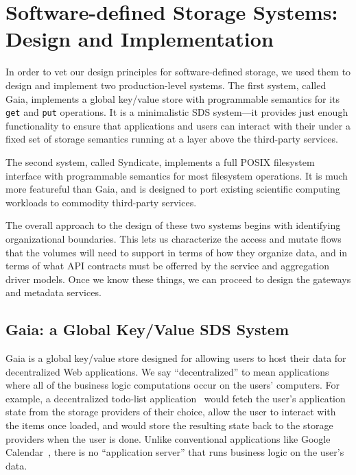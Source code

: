 \chapter{Software-defined Storage Systems: Design and Implementation}
\label{chap:syndicate_sds}

In order to vet our design principles for software-defined storage, we used them
to design and implement two production-level systems.  The first system,
called Gaia, implements a global key/value store with programmable semantics for its
\texttt{get} and \texttt{put} operations.  It is a minimalistic SDS system---it
provides just enough functionality to ensure that applications and
users can interact with their under a fixed set of storage
semantics running at a layer above the third-party services.

The second system, called Syndicate, implements
a full POSIX filesystem interface with programmable semantics for most
filesystem operations.  It is much more featureful than Gaia, and is designed
to port existing scientific computing workloads to commodity third-party
services.

The overall approach to the design of these two systems begins with identifying
organizational boundaries.  This lets us characterize the access and mutate
flows that the volumes will need to support in terms of how they organize data,
and in terms of what API contracts must be offerred by the service and
aggregation driver models.  Once we know these things, we can proceed to design the
gateways and metadata services.

\section{Gaia: a Global Key/Value SDS System}

Gaia is a global key/value store designed for allowing users to host their data
for decentralized Web applications.  We say ``decentralized'' to mean
applications where all of the business logic computations occur on the
users' computers.  For example, a decentralized todo-list
application~\cite{blockstack-todo} would fetch the user's application state from
the storage providers of their choice, allow the user to interact with the items
once loaded, and would store the resulting state back to the storage providers
when the user is done.  Unlike conventional applications like Google
Calendar~\cite{google-calendar}, there is no ``application server'' that
runs business logic on the user's data.

